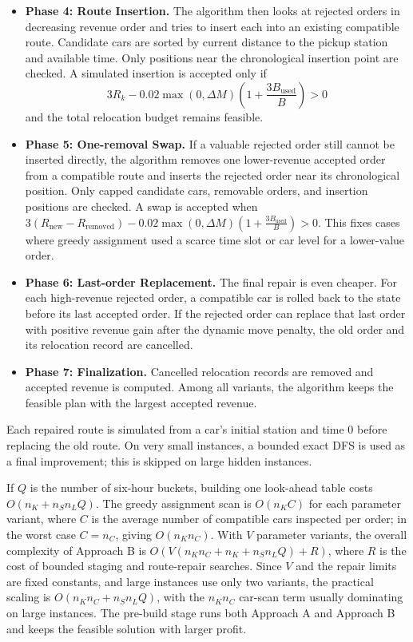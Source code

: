 \documentclass[10pt,a4paper]{article}
\begin{document}
\begin{itemize}[itemsep=2pt, parsep=0pt, topsep=4pt]
    \item \textbf{Phase 4: Route Insertion.} The algorithm then looks at
    rejected orders in decreasing revenue order and tries to insert each into an
    existing compatible route.  Candidate cars are sorted by current distance to
    the pickup station and available time.  Only positions near the chronological
    insertion point are checked.  A simulated insertion is accepted only if
    \[3R_k - 0.02\max(0,\Delta M)\left(1+\frac{3B_{\text{used}}}{B}\right) >0\]
    and the total relocation budget remains feasible.

    \item \textbf{Phase 5: One-removal Swap.} If a valuable rejected order still
    cannot be inserted directly, the algorithm removes one lower-revenue
    accepted order from a compatible route and inserts the rejected order near
    its chronological position.  Only capped candidate cars, removable orders,
    and insertion positions are checked.  A swap is accepted when
    $3(R_{\text{new}}-R_{\text{removed}}) - 0.02\max(0,\Delta M)\left(1+\frac{3B_{\text{used}}}{B}\right)>0$.
    This fixes cases where greedy assignment used a scarce time slot or car
    level for a lower-value order.

    \item \textbf{Phase 6: Last-order Replacement.} The final repair is even
    cheaper.  For each high-revenue rejected order, a compatible car is rolled
    back to the state before its last accepted order.  If the rejected order can
    replace that last order with positive revenue gain after the dynamic move
    penalty, the old order and its relocation record are cancelled.

    \item \textbf{Phase 7: Finalization.} Cancelled relocation records are
    removed and accepted revenue is computed.  Among all variants, the algorithm
    keeps the feasible plan with the largest accepted revenue.
\end{itemize}

Each repaired route is simulated from a car's initial station and time 0 before replacing the old route.  On very small instances, a bounded exact DFS is used as a final improvement; this is skipped on large hidden instances.

If $Q$ is the number of six-hour buckets, building one look-ahead table costs
$O(n_K+n_Sn_LQ)$.  The greedy assignment scan is $O(n_KC)$ for each parameter
variant, where $C$ is the average number of compatible cars inspected per order;
in the worst case $C=n_C$, giving $O(n_Kn_C)$.  With $V$ parameter variants,
the overall complexity of Approach B is
$O\!\left(V(n_Kn_C+n_K+n_Sn_LQ)+R\right)$,
where $R$ is the cost of bounded staging and route-repair searches.  Since $V$
and the repair limits are fixed constants, and large instances use only two
variants, the practical scaling is $O(n_Kn_C+n_Sn_LQ)$,
with the $n_Kn_C$ car-scan term usually dominating on large instances.  The
pre-build stage runs both Approach A and Approach B and keeps the feasible
solution with larger profit.
\end{document}
